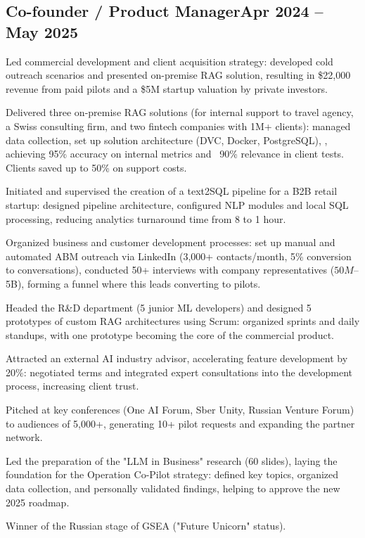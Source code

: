 \documentclass[a4paper,12pt]{article}
\begin{document}
\subsection{{Co-founder / Product Manager}\hfill Apr 2024 -- May 2025}
\begin{zitemize}
\item Led commercial development and client acquisition strategy: developed cold outreach scenarios and presented on-premise RAG solution, resulting in \$22,000 revenue from paid pilots and a \$5M startup valuation by private investors.
\item Delivered three on-premise RAG solutions (for internal support to travel agency, a Swiss consulting firm, and two fintech companies with 1M+ clients): managed data collection, set up solution architecture (DVC, Docker, PostgreSQL), , achieving 95\% accuracy on internal metrics and ~90\% relevance in client tests. Clients saved up to 50\% on support costs.
\item Initiated and supervised the creation of a text2SQL pipeline for a B2B retail startup: designed pipeline architecture, configured NLP modules and local SQL processing, reducing analytics turnaround time from 8 to 1 hour.
\item Organized business and customer development processes: set up manual and automated ABM outreach via LinkedIn (3,000+ contacts/month, 5\% conversion to conversations), conducted 50+ interviews with company representatives ($50M–$5B), forming a funnel where this leads converting to pilots.
\item Headed the R&D department (5 junior ML developers) and designed 5 prototypes of custom RAG architectures using Scrum: organized sprints and daily standups, with one prototype becoming the core of the commercial product.
\item Attracted an external AI industry advisor, accelerating feature development by 20\%: negotiated terms and integrated expert consultations into the development process, increasing client trust.
\item Pitched at key conferences (One AI Forum, Sber Unity, Russian Venture Forum) to audiences of 5,000+, generating 10+ pilot requests and expanding the partner network.
\item Led the preparation of the "LLM in Business" research (60 slides), laying the foundation for the Operation Co-Pilot strategy: defined key topics, organized data collection, and personally validated findings, helping to approve the new 2025 roadmap.
\item Winner of the Russian stage of GSEA ("Future Unicorn" status).
\end{zitemize}
\end{document}
